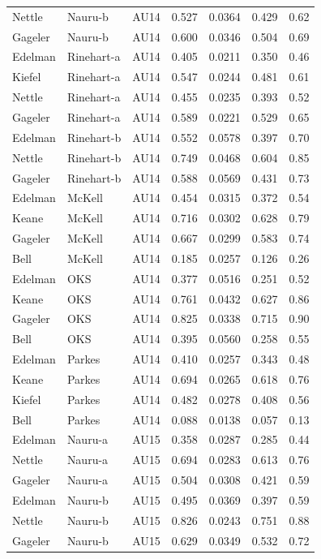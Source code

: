 \documentclass{monashthesis}
\begin{document}
\begin{center}
\begin{longtable}{lllllll}
Nettle & Nauru-b & AU14 & 0.527 & 0.0364 & 0.429 & 0.62 \\
Gageler & Nauru-b & AU14 & 0.600 & 0.0346 & 0.504 & 0.69 \\
Edelman & Rinehart-a & AU14 & 0.405 & 0.0211 & 0.350 & 0.46 \\
Kiefel & Rinehart-a & AU14 & 0.547 & 0.0244 & 0.481 & 0.61 \\
Nettle & Rinehart-a & AU14 & 0.455 & 0.0235 & 0.393 & 0.52 \\
Gageler & Rinehart-a & AU14 & 0.589 & 0.0221 & 0.529 & 0.65 \\
Edelman & Rinehart-b & AU14 & 0.552 & 0.0578 & 0.397 & 0.70 \\
Nettle & Rinehart-b & AU14 & 0.749 & 0.0468 & 0.604 & 0.85 \\
Gageler & Rinehart-b & AU14 & 0.588 & 0.0569 & 0.431 & 0.73 \\
Edelman & McKell & AU14 & 0.454 & 0.0315 & 0.372 & 0.54 \\
Keane & McKell & AU14 & 0.716 & 0.0302 & 0.628 & 0.79 \\
Gageler & McKell & AU14 & 0.667 & 0.0299 & 0.583 & 0.74 \\
Bell & McKell & AU14 & 0.185 & 0.0257 & 0.126 & 0.26 \\
Edelman & OKS & AU14 & 0.377 & 0.0516 & 0.251 & 0.52 \\
Keane & OKS & AU14 & 0.761 & 0.0432 & 0.627 & 0.86 \\
Gageler & OKS & AU14 & 0.825 & 0.0338 & 0.715 & 0.90 \\
Bell & OKS & AU14 & 0.395 & 0.0560 & 0.258 & 0.55 \\
Edelman & Parkes & AU14 & 0.410 & 0.0257 & 0.343 & 0.48 \\
Keane & Parkes & AU14 & 0.694 & 0.0265 & 0.618 & 0.76 \\
Kiefel & Parkes & AU14 & 0.482 & 0.0278 & 0.408 & 0.56 \\
Bell & Parkes & AU14 & 0.088 & 0.0138 & 0.057 & 0.13 \\
Edelman & Nauru-a & AU15 & 0.358 & 0.0287 & 0.285 & 0.44 \\
Nettle & Nauru-a & AU15 & 0.694 & 0.0283 & 0.613 & 0.76 \\
Gageler & Nauru-a & AU15 & 0.504 & 0.0308 & 0.421 & 0.59 \\
Edelman & Nauru-b & AU15 & 0.495 & 0.0369 & 0.397 & 0.59 \\
Nettle & Nauru-b & AU15 & 0.826 & 0.0243 & 0.751 & 0.88 \\
Gageler & Nauru-b & AU15 & 0.629 & 0.0349 & 0.532 & 0.72 \\

\end{longtable}
\end{center}
\end{document}
